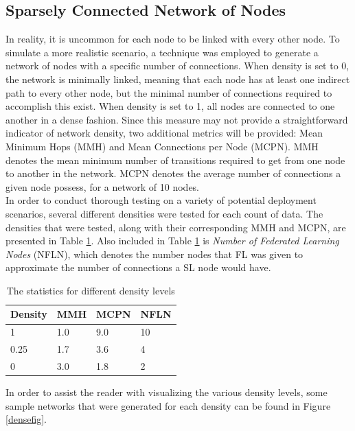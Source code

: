 \documentclass[letterpaper, 10 pt, conference]{ieeeconf}  %
\begin{document}
\subsection{Sparsely Connected Network of Nodes}
In reality, it is uncommon for each node to be linked with every other node. To simulate a more realistic scenario, a technique was employed to generate a network of nodes with a specific number of connections. When density is set to 0, the network is minimally linked, meaning that each node has at least one indirect path to every other node, but the minimal number of connections required to accomplish this exist. When density is set to 1, all nodes are connected to one another in a dense fashion. Since this measure may not provide a straightforward indicator of network density, two additional metrics will be provided:  Mean Minimum Hops (MMH) and Mean Connections per Node (MCPN). MMH denotes the mean minimum number of transitions required to get from one node to another in the network. MCPN denotes the average number of connections a given node possess, for a network of 10 nodes. \\

In order to conduct thorough testing on a variety of potential deployment scenarios, several different densities were tested for each count of data. The densities that were tested, along with their corresponding MMH and MCPN, are presented in Table \ref{sparsedensities}. Also included in Table \ref{sparsedensities} is \emph{Number of Federated Learning Nodes} (NFLN), which denotes the number nodes that FL was given to approximate the number of connections a SL node would have.

\begin{table}[H]
	\centering
	\begin{tabular}{l|l|l|l}
		Density & MMH & MCPN & NFLN \\ \hline
		1 & 1.0 & 9.0 &  10\\
		0.25    & 1.7 & 3.6 & 4 \\
		0    & 3.0 & 1.8  & 2 \\
	\end{tabular}
	\caption{The statistics for different density levels} \label{sparsedensities}
\end{table}

In order to assist the reader with visualizing the various density levels, some sample networks that were generated for each density can be found in Figure \ref{densefig}.
\end{document}
